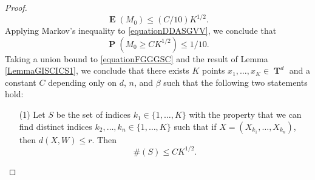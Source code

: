 \documentclass[12pt,reqno]{article}
\numberwithin{equation}{section}
\DeclareMathOperator{\TT}{\mathbf{T}}
\DeclareMathOperator{\EE}{\mathbf{E}}
\DeclareMathOperator{\PP}{\mathbf{P}}
\begin{document}
\begin{proof}
    \begin{equation} \label{equationDDASGVV}
        \EE(M_0) \leq (C/10) K^{1/2}.
    \end{equation}
    Applying Markov's inequality to \eqref{equationDDASGVV}, we conclude that
    \begin{equation} \label{equationFGGGSC}
        \PP(M_0 \geq C K^{1/2}) \leq 1/10.
    \end{equation}
    Taking a union bound to \eqref{equationFGGGSC} %
    and the result of Lemma \ref{LemmaGISCICS1}, we conclude that there exists $K$ points $x_1, \dots, x_K \in \TT^d$ and a constant $C$ depending only on $d$, $n$, and $\beta$ such that the following two statements hold:
    \begin{itemize}
        \item[(1)] Let $S$ be the set of indices $k_1 \in \{ 1, \dots, K \}$ with the property that we can find distinct indices $k_2, \dots, k_n \in \{ 1, \dots, K \}$ such that if $X = (X_{k_1}, \dots, X_{k_n})$, then $d(X, W) \leq r$. Then
        \begin{equation} \label{equationGGSC99124}
            \#(S) \leq C K^{1/2}.
        \end{equation}


\end{itemize}
\end{proof}
\end{document}

